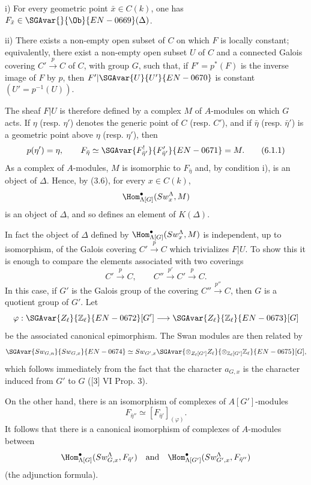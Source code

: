 i) For every geometric point $\bar x\in C(k)$, one has $F_{\bar x}\in\SGAvar{}{\Ob}{EN-0669}(\Delta)$.

ii) There exists a non-empty open subset of $C$ on which $F$ is locally constant; equivalently, there exist a non-empty open subset $U$ of $C$ and a connected Galois covering $C'\xrightarrow{p}C$ of $C$, with group $G$, such that, if $F'=p^*(F)$ is the inverse image of $F$ by $p$, then $F'|\SGAvar{U}{U'}{EN-0670}$ is constant $(U'=p^{-1}(U))$.

The sheaf $F|U$ is therefore defined by a complex $M$ of $A$-modules on which $G$ acts. If $\eta$ (resp. $\eta'$) denotes the generic point of $C$ (resp. $C'$), and if $\bar\eta$ (resp. $\bar\eta'$) is a geometric point above $\eta$ (resp. $\eta'$), then
\[
p(\eta')=\eta,\qquad
F_{\bar\eta}\simeq \SGAvar{F^{!}_{\bar\eta'}}{F'_{\bar\eta'}}{EN-0671}=M.
\tag{6.1.1}
\]
As a complex of $A$-modules, $M$ is isomorphic to $F_{\bar\eta}$ and, by condition i), is an object of $\Delta$. Hence, by (3.6), for every $x\in C(k)$,
\[
\Hom^\bullet_{\Lambda[G]}(Sw_x^\Lambda,M)
\]
is an object of $\Delta$, and so defines an element of $K(\Delta)$.

In fact the object of $\Delta$ defined by $\Hom^\bullet_{\Lambda[G]}(Sw_x^\Lambda,M)$ is independent, up to isomorphism, of the Galois covering $C'\xrightarrow{p}C$ which trivializes $F|U$. To show this it is enough to compare the elements associated with two coverings
\[
C'\xrightarrow{p}C,\qquad C''\xrightarrow{p'}C'\xrightarrow{p}C.
\]
In this case, if $G'$ is the Galois group of the covering $C''\xrightarrow{p''}C$, then $G$ is a quotient group of $G'$. Let
\[
\varphi:\SGAvar{Z_\ell}{\mathbb Z_\ell}{EN-0672}[G']\longrightarrow \SGAvar{Z_\ell}{\mathbb Z_\ell}{EN-0673}[G]
\]
be the associated canonical epimorphism. The Swan modules are then related by
\[
\SGAvar{Sw_{G,n}}{Sw_{G,x}}{EN-0674}\simeq Sw_{G',x}\SGAvar{\otimes_{Z_\ell[G']}Z_\ell}{\otimes_{\mathbb Z_\ell[G']}\mathbb Z_\ell}{EN-0675}[G],
\]
which follows immediately from the fact that the character $a_{G,x}$ is the character induced from $G'$ to $G$ ([3] VI Prop. 3).

On the other hand, there is an isomorphism of complexes of $A[G']$-modules
\[
F_{\bar\eta''}\simeq [F_{\bar\eta'}]_{(\varphi)}.
\]
It follows that there is a canonical isomorphism of complexes of $A$-modules between
\[
\Hom^\bullet_{\Lambda[G]}(Sw_{G,x}^\Lambda,F_{\bar\eta'})
\quad\text{and}\quad
\Hom^\bullet_{\Lambda[G']}(Sw_{G',x}^\Lambda,F_{\bar\eta''})
\]
(the adjunction formula).

